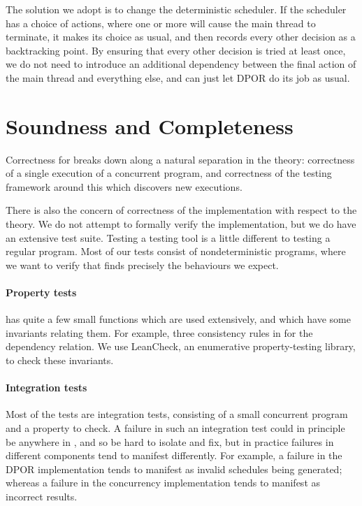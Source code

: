 The solution we adopt is to change the deterministic scheduler.  If
the scheduler has a choice of actions, where one or more will cause
the main thread to terminate, it makes its choice as usual, and then
records every other decision as a backtracking point.  By ensuring
that every other decision is tried at least once, we do not need to
introduce an additional dependency between the final action of the
main thread and everything else, and can just let DPOR do its job as
usual.

\section{Soundness and Completeness}
\label{sec:dejafu-correctness}

Correctness for \dejafu{} breaks down along a natural separation in
the theory: correctness of a single execution of a concurrent program,
and correctness of the testing framework around this which discovers
new executions.

There is also the concern of correctness of the implementation with
respect to the theory.  We do not attempt to formally verify the
implementation, but we do have an extensive test suite.  Testing a
testing tool is a little different to testing a regular program.  Most
of our tests consist of nondeterministic programs, where we want to
verify that \dejafu{} finds precisely the behaviours we expect.

\paragraph{Property tests}
\dejafu{} has quite a few small functions which are used extensively,
and which have some invariants relating them.  For example, three
consistency rules in  for the dependency
relation.  We use LeanCheck\cite{leancheck}, an enumerative
property-testing library, to check these invariants.

\paragraph{Integration tests}
Most of the tests are integration tests, consisting of a small
concurrent program and a property to check.  A failure in such an
integration test could in principle be anywhere in \dejafu{}, and so
be hard to isolate and fix, but in practice failures in different
components tend to manifest differently.  For example, a failure in
the DPOR implementation tends to manifest as invalid schedules being
generated; whereas a failure in the concurrency implementation tends
to manifest as incorrect results.

